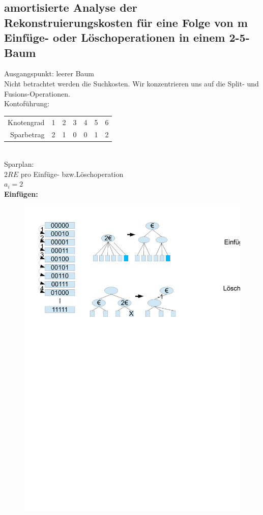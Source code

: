 \documentclass[a4paper,twoside,10pt]{report}
\begin{document}
{\subsection{amortisierte Analyse der Rekonstruierungskosten für eine Folge von m Einfüge- oder Löschoperationen in einem 2-5-Baum}
Ausgangspunkt: leerer Baum\\
Nicht betrachtet werden die Suchkosten. Wir konzentrieren uns auf die Split- und Fusions-Operationen.\\[.5em]
Kontoführung:\\
\begin{tabular}{rcccccc}
Knotengrad&1&2&3&4&5&6\\
Sparbetrag&2&1&0&0&1&2
\end{tabular}\\[.5em]
Sparplan:\\
$2RE$ pro Einfüge- bzw.Löschoperation\\
$a_i=2$\\
\textbf{Einfügen:}
\begin{figure}[H]\center
\includegraphics[trim= 6cm 24cm 6cm 1cm,clip,width=\columnwidth]{figures/zaehler.pdf}

\end{figure}}
\end{document}
